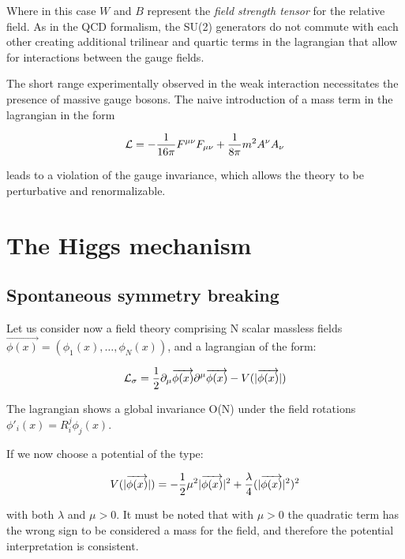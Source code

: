 Where in this case $W$ and $B$ represent the \emph{field strength tensor} for the relative field. As in the QCD formalism, the SU(2) generators do not commute with each other creating additional trilinear and quartic terms in the lagrangian that allow for interactions between the gauge fields.

The short range experimentally observed in the weak interaction necessitates the presence of massive gauge bosons. The naive introduction of a mass term in the lagrangian in the form

\begin{equation}
\mathcal{L} = -\frac{1}{16\pi}F^{\mu\nu}F_{\mu\nu}+\frac{1}{8\pi}m^2 A^{\nu}A_{\nu}
\label{eq:weak_free}
\end{equation}

leads to a violation of the gauge invariance, which allows the theory to be perturbative and renormalizable.

\section{The Higgs mechanism}

\subsection{Spontaneous symmetry breaking}

Let us consider now a field theory comprising N scalar massless fields $\vec{\phi(x)} = (\phi_1(x),\ldots,\phi_N(x))$, and a lagrangian of the form:

\begin{equation}
\mathcal{L}_\sigma = \dfrac{1}{2} \partial_\mu \overrightarrow{\phi(x)} \partial^\mu \overrightarrow{\phi(x)} - V(|\overrightarrow{\phi(x)}|)
\label{eq:lin_sigma}
\end{equation}

The lagrangian shows a global invariance O(N) under the field rotations $\phi'_i(x) = R_i^j \phi_j(x)$. 

If we now choose a potential of the type:

\begin{equation}
V(|\overrightarrow{\phi(x)}|) = - \dfrac{1}{2} \mu^2 |\overrightarrow{\phi(x)}|^2 + \dfrac{\lambda}{4} (|\overrightarrow{\phi(x)}|^2)^2
\label{eq:lin_sigma}
\end{equation} 

with both $\lambda$ and $\mu > 0$. It must be noted that with $\mu > 0$ the quadratic term has the wrong sign to be considered a mass for the field, and therefore the potential interpretation is consistent.

